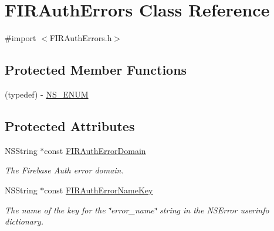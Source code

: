 \hypertarget{interface_f_i_r_auth_errors}{}\section{F\+I\+R\+Auth\+Errors Class Reference}
\label{interface_f_i_r_auth_errors}


{\ttfamily \#import $<$F\+I\+R\+Auth\+Errors.\+h$>$}

\subsection*{Protected Member Functions}
\begin{DoxyCompactItemize}
\item 
(typedef) -\/ \hyperlink{interface_f_i_r_auth_errors_a555636ac7403f4779617c8a647e5c279}{N\+S\+\_\+\+E\+N\+U\+M}
\end{DoxyCompactItemize}
\subsection*{Protected Attributes}
\begin{DoxyCompactItemize}
\item 
\hypertarget{interface_f_i_r_auth_errors_a83513149a1f893251c6926998a81f0fc}{}N\+S\+String $\ast$const \hyperlink{interface_f_i_r_auth_errors_a83513149a1f893251c6926998a81f0fc}{F\+I\+R\+Auth\+Error\+Domain}\label{interface_f_i_r_auth_errors_a83513149a1f893251c6926998a81f0fc}

\begin{DoxyCompactList}\small\item\em The Firebase Auth error domain. \end{DoxyCompactList}\item 
\hypertarget{interface_f_i_r_auth_errors_adfecf0870e3de7baf9d6ff0e9ac9df52}{}N\+S\+String $\ast$const \hyperlink{interface_f_i_r_auth_errors_adfecf0870e3de7baf9d6ff0e9ac9df52}{F\+I\+R\+Auth\+Error\+Name\+Key}\label{interface_f_i_r_auth_errors_adfecf0870e3de7baf9d6ff0e9ac9df52}

\begin{DoxyCompactList}\small\item\em The name of the key for the \char`\"{}error\+\_\+name\char`\"{} string in the N\+S\+Error userinfo dictionary. \end{DoxyCompactList}\end{DoxyCompactItemize}


